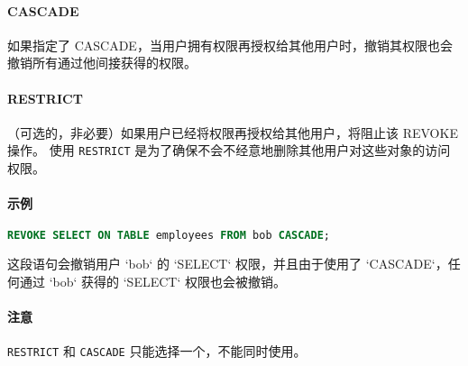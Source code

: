 \paragraph*{CASCADE}
如果指定了 CASCADE，当用户拥有权限再授权给其他用户时，撤销其权限也会撤销所有通过他间接获得的权限。

\paragraph*{RESTRICT} 
（可选的，非必要）如果用户已经将权限再授权给其他用户，将阻止该 REVOKE 操作。
使用 \lstinline|RESTRICT| 是为了确保不会不经意地删除其他用户对这些对象的访问权限。

\paragraph*{示例}
\begin{lstlisting}[language=SQL]
REVOKE SELECT ON TABLE employees FROM bob CASCADE;
\end{lstlisting}
这段语句会撤销用户 `bob` 的 `SELECT` 权限，并且由于使用了 `CASCADE`，任何通过 `bob` 获得的 `SELECT` 权限也会被撤销。

\paragraph*{注意}
\texttt{RESTRICT} 和 \texttt{CASCADE} 只能选择一个，不能同时使用。






